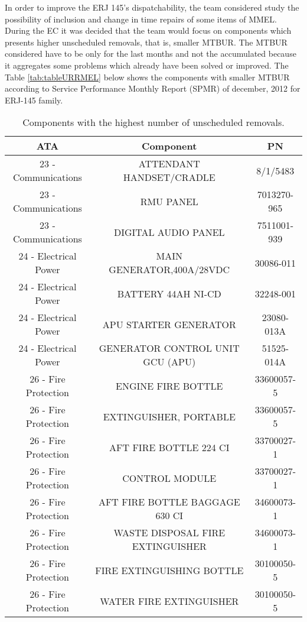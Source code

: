 In order to improve the ERJ 145's dispatchability, the team considered study the possibility of inclusion and change in time repairs of some items of MMEL.
During the EC it was decided that the team would focus on components which presents higher unscheduled removals, that is, smaller MTBUR.
The MTBUR considered have to be only for the last months and not the accumulated because it aggregates some problems which already have been solved or improved.
The Table \ref{tab:tableURRMEL} below shows the components with smaller MTBUR according to Service Performance Monthly Report (SPMR) of december, 2012 for ERJ-145 family.

\begin{table}[H]
  \centering
  \tiny
  \caption{Components with the highest number of unscheduled removals.}
    \begin{tabular}{ccc}
    \toprule
    \textbf{ATA} & \textbf{Component} & \textbf{PN} \\
    \midrule
    23 - Communications & ATTENDANT HANDSET/CRADLE & 8/1/5483 \\
    23 - Communications & RMU PANEL & 7013270-965 \\
    23 - Communications & DIGITAL AUDIO PANEL & 7511001-939 \\
    24 - Electrical Power & MAIN GENERATOR,400A/28VDC & 30086-011 \\
    24 - Electrical Power & BATTERY 44AH NI-CD & 32248-001 \\
    24 - Electrical Power & APU STARTER GENERATOR & 23080-013A \\
    24 - Electrical Power & GENERATOR CONTROL UNIT GCU (APU) & 51525-014A \\
    26 - Fire Protection & ENGINE FIRE BOTTLE & 33600057-5 \\
    26 - Fire Protection & EXTINGUISHER, PORTABLE & 33600057-5 \\
    26 - Fire Protection & AFT FIRE BOTTLE 224 CI & 33700027-1 \\
    26 - Fire Protection & CONTROL MODULE & 33700027-1 \\
    26 - Fire Protection & AFT FIRE BOTTLE BAGGAGE 630 CI & 34600073-1 \\
    26 - Fire Protection & WASTE DISPOSAL FIRE EXTINGUISHER & 34600073-1 \\
    26 - Fire Protection & FIRE EXTINGUISHING BOTTLE & 30100050-5 \\
    26 - Fire Protection & WATER FIRE EXTINGUISHER & 30100050-5 \\

\end{tabular}
\end{table}

